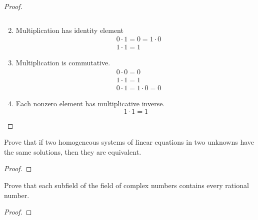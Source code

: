 \begin{proof}
\begin{enumerate}[label = (\arabic*)]
\[		      \]
		\item Multiplication has identity element
		      \[
			      \begin{split}
				      &0\cdot 1 = 0 = 1\cdot 0 \\
				      &1\cdot 1 = 1
			      \end{split}
		      \]
		\item Multiplication is commutative.
		      \[
			      \begin{split}
				      &0\cdot 0 = 0 \\
				      &1\cdot 1 = 1 \\
				      &0\cdot 1 = 1\cdot 0 = 0
			      \end{split}
		      \]
		\item Each nonzero element has multiplicative inverse.
		      \[
			      1\cdot 1 = 1
		      \]
	\end{enumerate}
\end{proof}

\begin{exercise}
	Prove that if two homogeneous systems of linear equations in two unknowns have the same solutions, then they are equivalent.
\end{exercise}

\begin{proof}
\end{proof}

\begin{exercise}
	Prove that each subfield of the field of complex numbers contains every rational number.
\end{exercise}

\begin{proof}
\end{proof}

